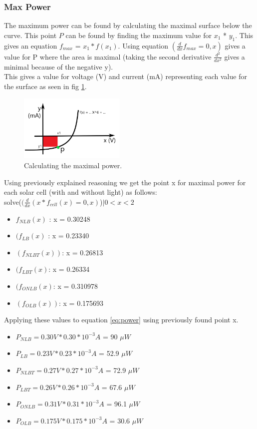 \documentclass[conference]{IEEEtran}
\begin{document}
\subsubsection{Max Power}
The maximum power can be found by calculating the maximal surface below the curve. This point $P$ can be found by finding the maximum value for $x_1$ * $y_1$. This gives an equation $f_{max}$ = $x_1 * f(x_1)$. Using equation $(\frac{d}{dx} f_{max} = 0 , x)$ gives a value for P where the area is maximal (taking the second derivative $\frac{d^2}{dx^2}$ gives a minimal because of the negative y).\\This gives a value for voltage (V) and current (mA) representing each value for the surface as seen in fig \ref{fig:powercalc}.
\begin{figure}[H]
\centering
\includegraphics[width=0.45\textwidth]{img/powercalc2.png}
\caption{Calculating the maximal power.}
\label{fig:powercalc} %
\end{figure}
Using previously explained reasoning we get the point x for maximal power for each solar cell (with and without light) as follows:\\
solve($(\frac{d}{dx}(x*f_{cell}(x) = 0,x)$)$|0<x<2$
\begin{itemize}
 \item$f_{NLB}(x)$ : x = 0.30248
 \item$(f_{LB}(x)$ : x = 0.23340
 \item$(f_{NLBT}(x))$: x = 0.26813
 \item$(f_{LBT}(x)$: x = 0.26334
 \item$(f_{ONLB}(x)$: x = 0.310978
 \item$(f_{OLB}(x))$: x = 0.175693
\end{itemize}
Applying these values to equation \ref{eq:power} using previously found point x.
\begin{itemize}
 \item$P_{NLB} = 0.30V * 0.30* 10^{-3} A$ = 90 $\mu W$
 \item$P_{LB} = 0.23V * 0.23* 10^{-3} A$ = 52.9 $\mu W$
 \item$P_{NLBT} = 0.27V * 0.27* 10^{-3} A$ = 72.9 $\mu W$
 \item$P_{LBT} = 0.26V * 0.26* 10^{-3} A$ = 67.6 $\mu W$
 \item$P_{ONLB} = 0.31V * 0.31* 10^{-3} A$ = 96.1 $\mu W$
 \item$P_{OLB} = 0.175V * 0.175* 10^{-3} A$ = 30.6 $\mu W$ 
\end{itemize}
\end{document}
